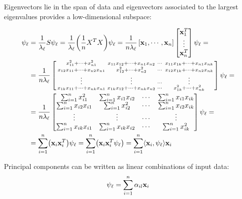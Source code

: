 Eigenvectors lie in the span of data and eigenvectors associated to the largest eigenvalues provides a low-dimensional subspace:

\begin{equation}
\begin{aligned}
\psi_\ell  &= \frac{1}{\lambda_\ell} S \psi_\ell = \frac{1}{\lambda_\ell} \br{\frac{1}{n}X^TX} \psi_\ell = \frac{1}{n\lambda_\ell} \left[\x_1, \cdots, \x_n \right] \begin{bmatrix} \x_1^T \\ \vdots\\ \x_n^T\end{bmatrix} \psi_\ell = \\
&= \frac{1}{n\lambda_\ell} \left[\begin{smallmatrix}
	x_{11}^2 +\cdots  +x_{n1}^2             & x_{11}x_{12}+\cdots +x_{n1}x_{n2}& \cdots &x_{11}x_{1k}+\cdots +x_{n1}x_{nk}\\
	x_{12} x_{11} +\cdots + x_{n2}x_{n1} & x_{12}^2+\cdots +x_{n2}^2          &\cdots &x_{12}x_{1k}+\cdots +x_{n2}x_{nk}\\
	\vdots&\vdots&\cdots &\vdots \\
	x_{1k} x_{11} +\cdots + x_{nk}x_{n1} & x_{1k}x_{12} +\cdots +x_{nk}x_{n2}  &\cdots &x_{1k}^2+\cdots +x_{nk}^2
\end{smallmatrix}\right]\psi_\ell =\\
&= \frac{1}{n\lambda_\ell} \begin{bmatrix}
\sum_{i=1}^n x_{i1}^2     &\sum_{i=1}^n x_{i1}x_{i2}& \cdots &\sum_{i=1}^n x_{i1}x_{ik}\\
\sum_{i=1}^nx_{i2} x_{i1} & \sum_{i=1}^n x_{i2}^2          &\cdots &\sum_{i=1}^n x_{i2}x_{ik}\\
\vdots&\vdots&\cdots &\vdots \\
\sum_{i=1}^n x_{ik} x_{i1}  & \sum_{i=1}^n x_{ik}x_{i2}         &\cdots &\sum_{i=1}^n x_{ik}^2
\end{bmatrix}\psi_\ell = \\
&=\sum_{i=1}^n \br{\x_i \x_i^T}\psi_\ell = \sum_{i=1}^n \br{\x_i \x_i^T\psi_\ell} = \sum_{i=1}^n \langle \x_i,\psi_\ell\rangle\x_i
\end{aligned}
\end{equation}

Principal components can be written as linear combinations of input data:
\begin{equation}
\label{PCALinComb}
\psi_\ell = \sum_{i=1}^n \alpha_{il} \mathbf{x}_i
\end{equation}


